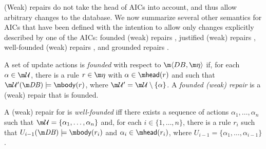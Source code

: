 (Weak) repairs do not take the head of AICs into account, and thus allow arbitrary changes to the database. We now summarize several other semantics for AICs that have been defined with the intention to allow only changes explicitly described by one of the AICs: founded (weak) repairs \cite{iclp/CaropreseGSZ06}, justified (weak) repairs \cite{tplp/CaropreseT11}, well-founded (weak) repairs \cite{tase/Cruz-FilipeEGN13}, and grounded repairs \cite{iclp/Cruz-Filipe16}.

%  


\begin{definition}
 A set of update actions \UU is \emph{founded} with respect to $\fulldb$ if, for each $\alpha \in \UU$, there is a rule  $r\in \aics$ with $\alpha\in\head(r)$ and such that $\UU'(\db)\models \body(r)$, where $\UU'=\UU\setminus\{\alpha\}$. A \emph{founded (weak) repair} is a (weak) repair that is founded.
\end{definition}

\begin{definition}
 A (weak) repair \UU for \fulldb is \emph{well-founded} iff there exists a sequence of actions $\alpha_1,\dots,\alpha_n$ such that $\UU=\{\alpha_1,\dots,\alpha_n\}$ and, for each $i\in\{1,\dots,n\}$, there is a rule $r_i$ such that $U_{i-1}(\db) \models \body (r_i)$ and $\alpha_i \in \head(r_i)$, where $U_{i-1} = \{\alpha_1,\dots,\alpha_{i-1}\}$.
\end{definition}


